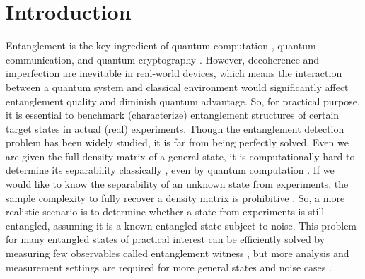 \documentclass[
aps,
pra,
twocolumn,
floatfix,
]{revtex4-2}
\theoremstyle{plain}
\theoremstyle{definition}
\begin{document}
\section{Introduction}
Entanglement \cite{horodeckiQuantumEntanglement2009} is the key ingredient of quantum computation \cite{briegelMeasurementbasedQuantumComputation2009}, quantum communication, and quantum cryptography \cite{xuSecureQuantumKey2020}.
However, decoherence and imperfection are inevitable in real-world devices, which means the interaction between a quantum system and classical environment would significantly affect entanglement quality and diminish quantum advantage. 
So, for practical purpose, it is essential to benchmark (characterize) entanglement structures of certain target states in actual (real) experiments.
Though the entanglement detection problem \cite{guhneEntanglementDetection2009} has been widely studied,
it is far from being perfectly solved.
Even we are given the full density matrix of a general state, it is computationally hard to determine its separability classically \cite{gurvitsClassicalDeterministicComplexity2003}, even by quantum computation \cite{gutoskiQuantumInteractiveProofs2015}.
If we would like to know the separability of an unknown state from experiments, the sample complexity to fully recover a density matrix is prohibitive \cite{haahSampleoptimalTomographyQuantum2017} \cite{odonnellEfficientQuantumTomography2016}.
So, a more realistic scenario is to determine whether a state from experiments is still entangled, assuming it is a known entangled state subject to noise.
This problem for many entangled states of practical interest can be efficiently solved by measuring few observables called entanglement witness \cite{bourennaneWitnessingMultipartiteEntanglement2004} \cite{tothDetectingGenuineMultipartite2005} \cite{tothEntanglementDetectionStabilizer2005}, but more analysis and measurement settings are required for more general states and noise cases \cite{guhneNonlinearEntanglementWitnesses2006} \cite{zhouEntanglementDetectionCoherent2020} \cite{zhangEfficientEntanglementGeneration2021}.
\end{document}
